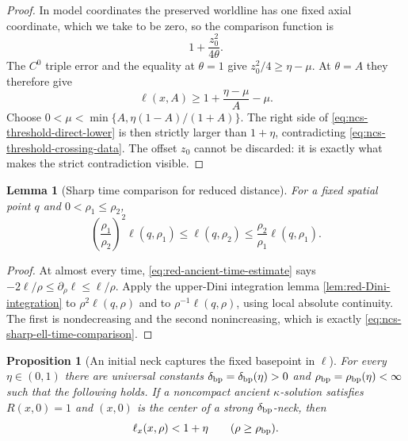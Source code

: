 \documentclass[10pt]{coll-l}
\newtheorem{lemma}[theorem]{Lemma}
\newtheorem{proposition}[theorem]{Proposition}
\theoremstyle{definition}
\theoremstyle{remark}
\numberwithin{section}{chapter}
\numberwithin{equation}{chapter}
\begin{document}
\begin{proof}
In model coordinates the preserved worldline has one fixed axial
coordinate, which we take to be zero, so the comparison function is
\begin{equation}
                         1+\frac{z_0^2}{4\theta}.       \label{eq:ncs-threshold-model-worldline}
\end{equation}
The $C^0$ triple error and the equality at $\theta=1$ give
$z_0^2/4\geq\eta-\mu$.  At $\theta=A$ they therefore give
\begin{equation}
       \ell(x,A)\geq1+\frac{\eta-\mu}{A}-\mu.          \label{eq:ncs-threshold-direct-lower}
\end{equation}
Choose
$0<\mu<\min\{A,\eta(1-A)/(1+A)\}$.  The right side of
\eqref{eq:ncs-threshold-direct-lower} is then strictly larger than
$1+\eta$, contradicting \eqref{eq:ncs-threshold-crossing-data}.  The
offset $z_0$ cannot be discarded: it is exactly what makes the strict
contradiction visible.
\end{proof}

\begin{lemma}[Sharp time comparison for reduced distance]
\label{lem:ncs-sharp-ell-time-comparison}
For a fixed spatial point $q$ and $0<\rho_1\leq\rho_2$,
\begin{equation}
 \left(\frac{\rho_1}{\rho_2}\right)^2\ell(q,\rho_1)
 \leq\ell(q,\rho_2)
 \leq\frac{\rho_2}{\rho_1}\ell(q,\rho_1).             \label{eq:ncs-sharp-ell-time-comparison}
\end{equation}
\end{lemma}

\begin{proof}
At almost every time,
\eqref{eq:red-ancient-time-estimate} says
$-2\ell/\rho\leq\partial_\rho\ell\leq\ell/\rho$.
Apply the upper-Dini integration lemma
\ref{lem:red-Dini-integration} to
$\rho^2\ell(q,\rho)$ and to $\rho^{-1}\ell(q,\rho)$, using local absolute
continuity.  The first is nondecreasing and the second nonincreasing, which
is exactly \eqref{eq:ncs-sharp-ell-time-comparison}.
\end{proof}

\begin{proposition}[An initial neck captures the fixed basepoint in $\ell$]
\label{prop:ncs-fixed-worldline-capture}
For every $\eta\in(0,1)$ there are universal constants
$\delta_{\rm bp}=\delta_{\rm bp}(\eta)>0$ and
$\rho_{\rm bp}=\rho_{\rm bp}(\eta)<\infty$ such that the following holds.
If a noncompact ancient $\kappa$-solution satisfies
$R(x,0)=1$ and $(x,0)$ is the center of a strong
$\delta_{\rm bp}$-neck, then
\begin{equation}
                         \ell_x(x,\rho)<1+\eta
                         \qquad(\rho\geq\rho_{\rm bp}).\label{eq:ncs-fixed-worldline-ell-bound}
\end{equation}
\end{proposition}
\end{document}
